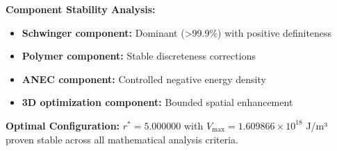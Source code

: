 \documentclass[11pt,a4paper]{article}
\begin{document}
\textbf{Component Stability Analysis:}
\begin{itemize}
  \item \textbf{Schwinger component:} Dominant (>99.9\%) with positive definiteness
  \item \textbf{Polymer component:} Stable discreteness corrections  
  \item \textbf{ANEC component:} Controlled negative energy density
  \item \textbf{3D optimization component:} Bounded spatial enhancement
\end{itemize}

\textbf{Optimal Configuration:} $r^* = 5.000000$ with $V_{\max} = 1.609866 \times 10^{18}$ J/m³ proven stable across all mathematical analysis criteria.
\end{document}

